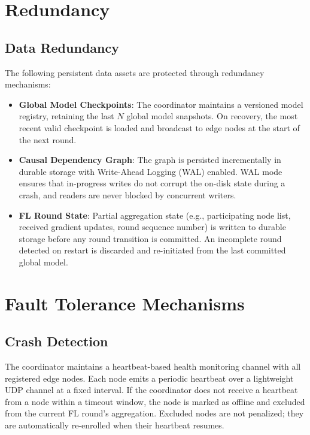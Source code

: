 \section{Redundancy}
\label{sec:reliability_redundancy}

\subsection{Data Redundancy}
\label{subsec:redundancy_data}

The following persistent data assets are protected through redundancy mechanisms:

\begin{itemize}
    \item \textbf{Global Model Checkpoints}: The coordinator maintains a versioned
    model registry, retaining the last $N$ global model snapshots. On recovery, the
    most recent valid checkpoint is loaded and broadcast to edge nodes at the start of
    the next round.

    \item \textbf{Causal Dependency Graph}: The graph is persisted incrementally in
    durable storage with Write-Ahead Logging (WAL) enabled. WAL mode ensures that 
    in-progress writes do not corrupt the on-disk state during a crash, and readers 
    are never blocked by concurrent writers.

    \item \textbf{FL Round State}: Partial aggregation state (e.g., participating node list,
    received gradient updates, round sequence number) is written to durable storage
    before any round transition is committed. An incomplete round detected on restart
    is discarded and re-initiated from the last committed global model.
\end{itemize}

\section{Fault Tolerance Mechanisms}
\label{sec:fault_tolerance_mechanisms}

\subsection{Crash Detection}
\label{subsec:ft_crash_recovery}

The coordinator maintains a heartbeat-based health monitoring channel with all
registered edge nodes. Each node emits a periodic heartbeat over a lightweight UDP
channel at a fixed interval. If the coordinator does not receive a heartbeat from 
a node within a timeout window, the node is marked as offline and excluded from the 
current FL round's aggregation. Excluded nodes are not penalized; they are automatically 
re-enrolled when their heartbeat resumes.

